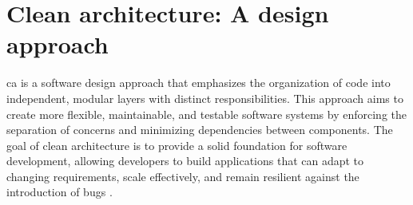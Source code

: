 \section{Clean architecture: A design approach}\label{sec_ca_theory}

\gls{ca} is a software design approach that emphasizes the organization of code
into independent, modular layers with distinct responsibilities. This approach aims to
create more flexible, maintainable, and testable software systems by enforcing the
separation of concerns and minimizing dependencies between components. The goal of clean
architecture is to provide a solid foundation for software development, allowing
developers to build applications that can adapt to changing requirements, scale
effectively, and remain resilient against the introduction of bugs
\parencite{robert_c_martin_clean_2018}.









